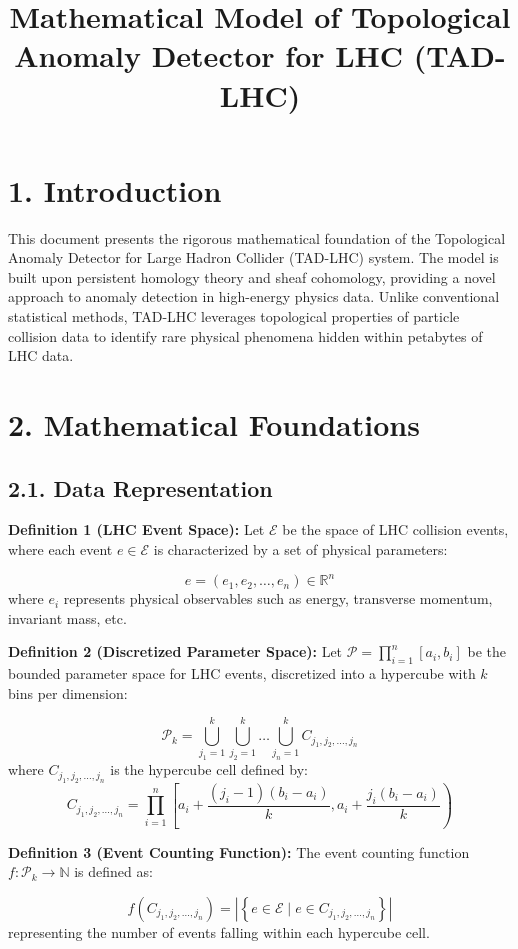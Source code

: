 \documentclass[12pt]{article}
\title{Mathematical Model of Topological Anomaly Detector for LHC (TAD-LHC)}
\author{}
\date{}
\begin{document}
\maketitle

\section*{1. Introduction}
This document presents the rigorous mathematical foundation of the Topological Anomaly Detector for Large Hadron Collider (TAD-LHC) system. The model is built upon persistent homology theory and sheaf cohomology, providing a novel approach to anomaly detection in high-energy physics data. Unlike conventional statistical methods, TAD-LHC leverages topological properties of particle collision data to identify rare physical phenomena hidden within petabytes of LHC data.

\section*{2. Mathematical Foundations}

\subsection*{2.1. Data Representation}
\textbf{Definition 1 (LHC Event Space):} Let $\mathcal{E}$ be the space of LHC collision events, where each event $e \in \mathcal{E}$ is characterized by a set of physical parameters:

$$e = (e_1, e_2, \dots, e_n) \in \mathbb{R}^n$$
where $e_i$ represents physical observables such as energy, transverse momentum, invariant mass, etc.

\textbf{Definition 2 (Discretized Parameter Space):} Let $\mathcal{P} = \prod_{i=1}^n [a_i, b_i]$ be the bounded parameter space for LHC events, discretized into a hypercube with $k$ bins per dimension:

$$\mathcal{P}_k = \bigcup_{j_1=1}^k \bigcup_{j_2=1}^k \dots \bigcup_{j_n=1}^k C_{j_1,j_2,\dots,j_n}$$
where $C_{j_1,j_2,\dots,j_n}$ is the hypercube cell defined by:
$$C_{j_1,j_2,\dots,j_n} = \prod_{i=1}^n \left[a_i + \frac{(j_i-1)(b_i-a_i)}{k}, a_i + \frac{j_i(b_i-a_i)}{k}\right)$$

\textbf{Definition 3 (Event Counting Function):} The event counting function $f: \mathcal{P}_k \rightarrow \mathbb{N}$ is defined as:

$$f(C_{j_1,j_2,\dots,j_n}) = \left|\left\{e \in \mathcal{E} \mid e \in C_{j_1,j_2,\dots,j_n}\right\}\right|$$
representing the number of events falling within each hypercube cell.
\end{document}
